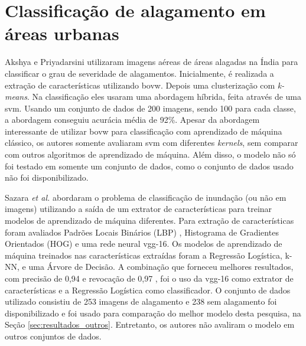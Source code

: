 \section{Classificação de alagamento em áreas urbanas}\label{sec:trabalhos_alagamento}
Akshya e Priyadarsini \cite{akshya2019} utilizaram imagens aéreas de áreas alagadas na Índia para classificar o grau de severidade de alagamentos. 
Inicialmente, é realizada a extração de características utilizando \acrfull{bovw}. Depois uma clusterização com \textit{k-means}. 
Na classificação eles usaram uma abordagem híbrida, feita através de uma \acrshort{svm}. 
Usando um conjunto de dados de 200 imagens, sendo 100 para cada classe, a abordagem conseguiu acurácia média de 92\%.
Apesar da abordagem interessante de utilizar \Acrshort{bovw} para classificação com aprendizado de máquina clássico, os autores somente avaliaram \acrshort{svm} com diferentes \textit{kernels},
sem comparar com outros algoritmos de aprendizado de máquina. Além disso, o modelo não só foi testado em somente um conjunto de dados, como o conjunto de dados usado não foi disponibilizado.




Sazara \textit{et al.} \cite{sazara2019} abordaram o problema de classificação de inundação (ou não em imagens) utilizando a saída de um extrator de características para treinar modelos de aprendizado de máquina diferentes. 
Para extração de características foram avaliados Padrões Locais Binários (LBP) , Histograma de Gradientes Orientados (HOG) e uma rede neural \acrshort{vgg}-16. 
Os modelos de aprendizado de máquina treinados nas características extraídas foram a Regressão Logística, k-NN, e uma Árvore de Decisão. 
A combinação que forneceu melhores resultados, com precisão de 0,94 e revocação de 0,97 , 
foi o uso da \acrshort{vgg}-16 como extrator de características e a Regressão Logística como classificador. 
O conjunto de dados utilizado consistiu de 253 imagens de alagamento e 238 sem alagamento foi disponibilizado e foi usado para comparação do melhor modelo desta pesquisa, na Seção \ref{sec:resultados_outros}.
Entretanto, os autores não avaliram o modelo em outros conjuntos de dados.

